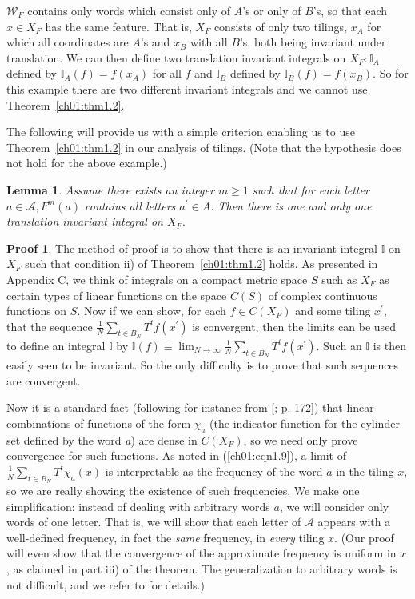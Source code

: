 \documentclass[reqno]{stml-l}
\theoremstyle{plain}
\newtheorem{lemma}[theorem]{Lemma}
\theoremstyle{definition}
\newtheorem*{proof*}{Proof}
\numberwithin{equation}{chapter}
\begin{document}
\noindent $\mathcal{W}_{F}$ contains only words which consist only of $A$'s or only of $B$'s, so that each $x\in X_{F}$ has the same feature. That is, $X_{F}$ consists of only two tilings, $x_{A}$ for which all coordinates are $A$'s and $x_{B}$ with all $B$'s, both being invariant under translation. We can then define two translation invariant integrals on $X_{F}:\mathbb{I}_{A}$ defined by $\mathbb{I}_{A}(f)=f(x_{A})$ for all $f$ and $\mathbb{I}_{B}$ defined by $\mathbb{I}_{B}(f)=f(x_{B})$. So for this example there are two different invariant integrals and we cannot use Theorem~\ref{ch01:thm1.2}.

The following will provide us with a simple criterion enabling us to use Theorem~\ref{ch01:thm1.2} in our analysis of tilings. (Note that the hypothesis does not hold for the above example.)

\begin{lemma}\label{ch01:lem1.5}
Assume there exists an integer $m\geq 1$ such that for each letter $a\in \mathcal{A},F^{m}(a)$ contains all letters $a^{\prime}\in A$. Then there is one and only one translation invariant integral on $X_{F}$.
\end{lemma}

\begin{proof*}
The method of proof is to show that there is an invariant integral $\mathbb{I}$
on $X_{F}$ such that condition ii) of Theorem~\ref{ch01:thm1.2} holds. As presented in Appendix C, we think of integrals on a compact metric space $S$ such as $X_{F}$ as certain types of linear functions on the space $C(S)$ of complex continuous functions on $S$. Now if we can show, for each $f\in C(X_{F})$ and some tiling $x^{\prime}$, that the sequence $\frac{1}{N}\sum\nolimits_{t\in B_{N}}T^{t}f(x^{\prime})$ is convergent, then the limits can be used to define an integral $\mathbb{I}$ by $\mathbb{I}(f)\equiv\lim_{N\rightarrow\infty}\frac{1}{N}\sum\nolimits_{t\in B_{N}}T^{t}f(x^{\prime})$. Such an $\mathbb{I}$ is then easily seen to be invariant. So the only difficulty is to prove that such sequences are convergent.\end{proof*}

Now it is a standard fact (following for instance from [; p. 172]) that linear combinations of functions of the form $\chi_{a}$ (the indicator function for the cylinder set defined by the word \emph{a}) are dense in $C(X_{F})$, so we need only prove convergence for such functions. As noted in (\ref{ch01:eqn1.9}), a limit of $\frac{1}{N}\sum\nolimits_{t\in B_{N}}T^{t}\chi_{a}(x)$ is interpretable as the frequency of the word $a$ in the tiling $x$, so we are really showing the existence of such frequencies. We make one simplification: instead of dealing with arbitrary words $a$, we will consider only words of one letter. That is, we will show that each letter of $\mathcal{A}$ appears with a well-defined frequency, in fact the \emph{same} frequency, in \emph{every} tiling $x$. (Our proof will even show that the convergence of the approximate frequency is uniform in $x$, as claimed in part iii) of the theorem. The generalization to arbitrary words is not difficult, and we refer to \cite{bib:Ra3} for details.)
\end{document}
